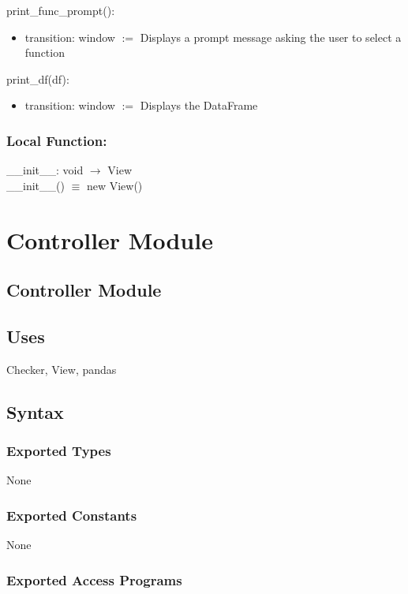 \documentclass[12pt]{article}
\begin{document}
\noindent print\_func\_prompt():
\begin{itemize}
\item transition: window $:=$ Displays a prompt message asking the user to select a function
\end{itemize}

\noindent print\_df(df):
\begin{itemize}
\item transition: window $:=$ Displays the DataFrame
\end{itemize}

\subsubsection*{Local Function:}

\_\_init\_\_: void $\rightarrow$ View \\
\_\_init\_\_() $\equiv$ new View()

\newpage

\section* {Controller Module}

\subsection* {Controller Module}

\subsection* {Uses}

Checker, View, pandas

\subsection* {Syntax}

\subsubsection* {Exported Types}

None

\subsubsection* {Exported Constants}

None

\subsubsection* {Exported Access Programs}
\end{document}
